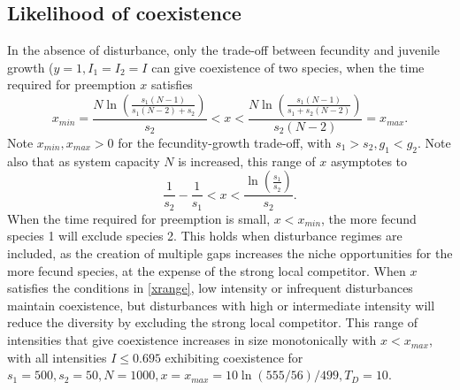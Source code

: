 \documentclass[a4paper]{article}
\begin{document}
\subsection{Likelihood of coexistence}
In the absence of disturbance, only the trade-off between fecundity and juvenile growth ($y=1, I_1=I_2=I$ can give coexistence of two species, when the time required for preemption $x$ satisfies
\begin{equation}
\label{xrange}
x_{min}=\frac{N\ln\left(\frac{s_1(N-1)}{s_1(N-2)+s_2}\right)}{s_2}<x<\frac{N\ln\left(\frac{s_1(N-1)}{s_1+s_2(N-2)}\right)}{s_2(N-2)}=x_{max}.
\end{equation}
Note $x_{min},x_{max}>0$ for the fecundity-growth trade-off, with $s_1>s_2, g_1<g_2$. Note also that as system capacity $N$ is increased, this range of $x$ asymptotes to
\begin{equation}
\label{bignxrange}
\frac{1}{s_2}-\frac{1}{s_1}<x<\frac{\ln\left(\frac{s_1}{s_2}\right)}{s_2}.
\end{equation} 
When the time required for preemption is small, $x<x_{min}$, the more fecund species 1 will exclude species 2. This holds when disturbance regimes are included, as the creation of multiple gaps increases the niche opportunities for the more fecund species, at the expense of the strong local competitor. When $x$ satisfies the conditions in \eqref{xrange}, low intensity or infrequent disturbances maintain coexistence, but disturbances with high or intermediate intensity will reduce the diversity by excluding the strong local competitor. This range of intensities that give coexistence increases in size monotonically with $x<x_{max}$, with all intensities $I \leq 0.695$ exhibiting coexistence for $s_1=500,s_2=50,N=1000,x=x_{max}=10 \ln(555/56)/499,T_D=10$.
\end{document}
